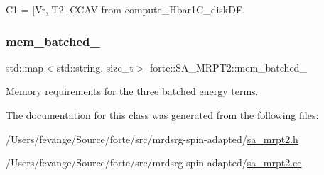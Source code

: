 C1 = \mbox{[}Vr, T2\mbox{]} C\+C\+AV from compute\+\_\+\+Hbar1\+C\+\_\+disk\+DF. 

\mbox{\label{classforte_1_1_s_a___m_r_p_t2_a922e808c913fb674508daafdf0b0bb18}} 
\subsubsection{\texorpdfstring{mem\+\_\+batched\+\_\+}{mem\_batched\_}}
{\footnotesize\ttfamily std\+::map$<$std\+::string, size\+\_\+t$>$ forte\+::\+S\+A\+\_\+\+M\+R\+P\+T2\+::mem\+\_\+batched\+\_\+\hspace{0.3cm}{\ttfamily [protected]}}



Memory requirements for the three batched energy terms. 



The documentation for this class was generated from the following files\+:\begin{DoxyCompactItemize}
\item 
/\+Users/fevange/\+Source/forte/src/mrdsrg-\/spin-\/adapted/\mbox{\hyperlink{sa__mrpt2_8h}{sa\+\_\+mrpt2.\+h}}\item 
/\+Users/fevange/\+Source/forte/src/mrdsrg-\/spin-\/adapted/\mbox{\hyperlink{sa__mrpt2_8cc}{sa\+\_\+mrpt2.\+cc}}\end{DoxyCompactItemize}
